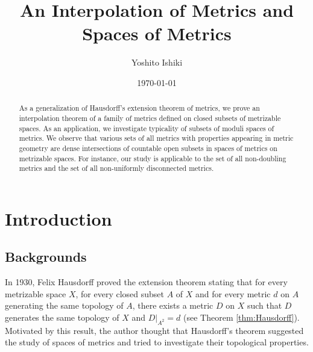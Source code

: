 \documentclass[a4paper, 12pt]{amsart}
\theoremstyle{plain}
\theoremstyle{definition}
\theoremstyle{remark}
\begin{document}
\title[An interpolation of metrics and spaces of metrics]
{An Interpolation of Metrics and Spaces of Metrics}

\author[Yoshito Ishiki]
{Yoshito Ishiki}


\address[Yoshito Ishiki]{
Department of Mathematical Sciences
\endgraf
Tokyo Metropolitan University
\endgraf
Minami-osawa Hachioji Tokyo 192-0397
\endgraf
Japan}






\date{\today}


\begin{abstract}
As a generalization of Hausdorff's extension theorem of metrics, we prove  an interpolation  theorem of a family of  metrics defined on closed subsets of metrizable spaces. As an application, we investigate typicality of subsets of moduli spaces of metrics. We observe that various  sets of all metrics with properties appearing  in metric geometry are dense intersections of countable open subsets  in spaces of metrics on metrizable spaces. For instance, our study is applicable to the set of all non-doubling metrics and the set of all non-uniformly disconnected metrics. 
\end{abstract}
\maketitle


\section{Introduction}
\subsection{Backgrounds}
In 1930, 
Felix 
Hausdorff 
\cite{Ha1930} 
proved the extension theorem stating  that for every metrizable space
 $X$, 
 for every closed subset 
 $A$ 
 of 
 $X$ 
 and for every 
metric 
$d$ 
on 
$A$
generating the same topology of 
$A$, 
there exists 
a metric 
$D$ 
on 
$X$ 
such that 
$D$ generates the same topology of 
$X$ and 
$D|_{A^2}=d$ 
(see Theorem 
\ref{thm:Hausdorff}). 
Motivated by this result, the author thought that Hausdorff's theorem suggested the study of spaces of metrics and tried to investigate their topological properties.
\end{document}
